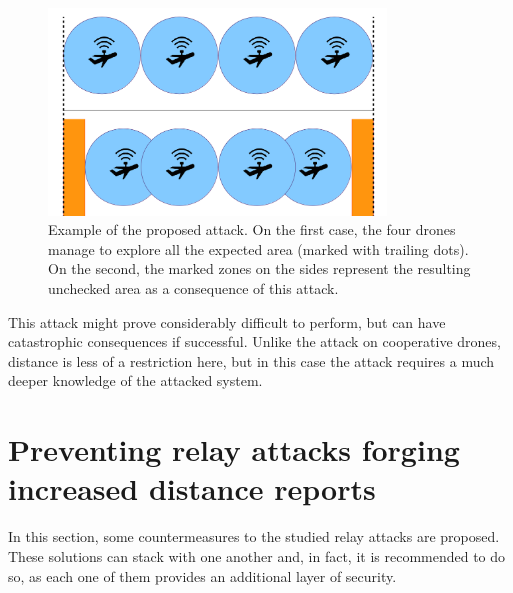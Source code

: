 \documentclass{article}
\begin{document}
\begin{description}
  \begin{figure}[h!]
  \centering
    \includegraphics[width=0.8\textwidth]{images/attack2.png}
  \caption{Example of the proposed attack. On the first case, the four drones manage to explore all the expected area (marked with trailing dots). On the second, the marked zones on the sides represent the resulting unchecked area as a consequence of this attack.}
  \label{fig:attackexample2}
\end{figure}

This attack might prove considerably difficult to perform, but can have catastrophic consequences if successful. Unlike the attack on cooperative drones, distance is less of a restriction here, but in this case the attack requires a much deeper knowledge of the attacked system.\\

\end{description}



















\section{Preventing relay attacks forging increased distance reports}
\label{sec:prevention}

In this section, some countermeasures to the studied relay attacks are proposed. These solutions can stack with one another and, in fact, it is recommended to do so, as each one of them provides an additional layer of security.\\
\end{document}
